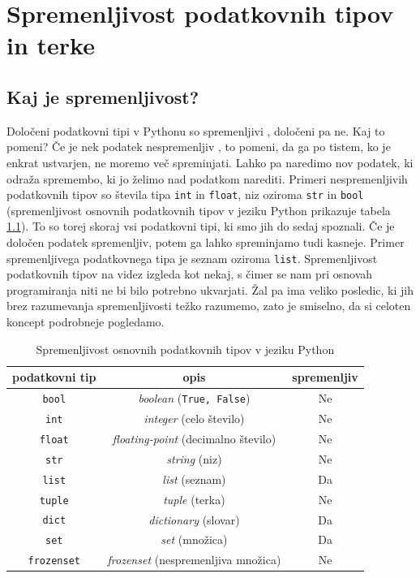 \chapter{Spremenljivost podatkovnih tipov in terke}

\section{Kaj je spremenljivost?}

Določeni podatkovni tipi v Pythonu so spremenljivi , določeni pa ne. Kaj to pomeni? Če je nek podatek nespremenljiv , to pomeni, da ga po tistem, ko je enkrat ustvarjen, ne moremo več spreminjati. Lahko pa naredimo nov podatek, ki odraža spremembo, ki jo želimo nad podatkom narediti. Primeri nespremenljivih podatkovnih tipov so števila tipa \texttt{int} in \texttt{float}, niz oziroma \texttt{str} in \texttt{bool} (spremenljivost osnovnih podatkovnih tipov v jeziku Python prikazuje tabela \ref{tab:spremenljivost}). To so torej skoraj vsi podatkovni tipi, ki smo jih do sedaj spoznali. Če je določen podatek spremenljiv, potem ga lahko spreminjamo tudi kasneje. Primer spremenljivega podatkovnega tipa je seznam oziroma \texttt{list}. Spremenljivost podatkovnih tipov na videz izgleda kot nekaj, s čimer se nam pri osnovah programiranja niti ne bi bilo potrebno ukvarjati. Žal pa ima veliko posledic, ki jih brez razumevanja spremenljivosti težko razumemo, zato je smiselno, da si celoten koncept podrobneje pogledamo. 
\begin{table}
    \caption{Spremenljivost osnovnih podatkovnih tipov v jeziku Python}
    \label{tab:spremenljivost}
    \centering
    \begin{tabular}{c|c|c}
    podatkovni tip & opis & spremenljiv  \\
    \hline
    \texttt{bool}& \textit{boolean} (\texttt{True, False}) & Ne \\
    \texttt{int}& \textit{integer} (celo število) & Ne \\
    \texttt{float}& \textit{floating-point} (decimalno število) & Ne \\
    \texttt{str}& \textit{string} (niz) & Ne \\
    \texttt{list}& \textit{list} (seznam) & Da \\
    \texttt{tuple}& \textit{tuple} (terka) & Ne \\
    \texttt{dict}& \textit{dictionary} (slovar) & Da \\
    \texttt{set}& \textit{set} (množica) & Da \\
    \texttt{frozenset}& \textit{frozenset} (nespremenljiva množica) & Ne \\
    \end{tabular}
\end{table}

